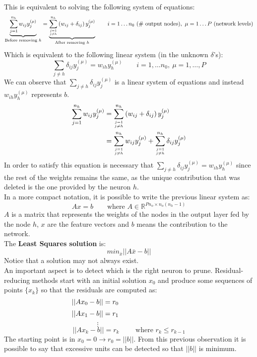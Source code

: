This is equivalent to solving the following system of equations:
$$\underbrace{\sum_{j=1}^{n_{h}} w_{ij} y_{j}^{(\mu)}}_{\text{Before removing }h} = \underbrace{\sum_{j=1 \atop j\neq h}^{n_{h}} \left( w_{ij} + \delta_{ij} \right) y_{j}^{ (\mu)}}_{\text{After removing }h} \qquad i=1 \dots n_0 \text{ (\# output nodes)},~\mu=1 \dots P \text{ (network levels)}$$
Which is equivalent to the following linear system (in the unknown $\delta$'s):
$$\sum_{j \neq h} \delta_{ij} y_{j}^{(\mu)} = w_{ih} y_{h}^{(\mu)} \qquad i=1, \dots n_0, ~ \mu=1,\dots, P$$
We can observe that $\sum_{j \neq h} \delta_{ij} y_{j}^{(\mu)}$ is a linear system of equations and instead $w_{ih} y_{h}^{(\mu)}$ represents $b$.
\begin{equation*}
\begin{split}
\sum_{j=1}^{n_{h}} w_{ij} y_{j}^{(\mu)} &= \sum_{j=1 \atop j\neq h}^{n_{h}} \left( w_{ij} + \delta_{ij} \right) y_{j}^{ (\mu)} \\
& = \sum_{j=1 \atop j\neq h}^{n_{h}} w_{ij}y_{j}^{ (\mu)} + \sum_{j=1 \atop j\neq h}^{n_{h}}\delta_{ij}  y_{j}^{ (\mu)}
\end{split}
\end{equation*}
In order to satisfy this equation is necessary that $\sum_{j \neq h} \delta_{ij} y_{j}^{(\mu)} = w_{ih} y_{h}^{(\mu)}$ since the rest of the weights remains the same, as the unique contribution that was deleted is the one provided by the neuron $h$.\\

In a more compact notation, it is possible to write the previous linear system as:
$$Ax = b \qquad \text{where } A \in \mathbb { R } ^ { P n _ { o } \times n _ { o } \left( n _ { h } - 1 \right) }$$
$A$ is a matrix that represents the weights of the nodes in the output layer fed by the node $h$, $x$ are the feature vectors and $b$ means the contribution to the network.\\
The \textbf{Least Squares solution} is:
$$min_{\bar{x}} \vert \vert A \bar{x} - b \vert \vert$$
Notice that a solution may not always exist.\\
An important aspect is to detect which is the right neuron to prune. Residual-reducing methods start with an initial solution $x_0$ and produce some sequences of points $\{x_k\}$ so that the residuals are computed as:
$$\vert \vert Ax_0 - b \vert \vert  = r_0 \hspace{9.7em} $$
$$\vert \vert Ax_1 - b \vert \vert  = r_1 \hspace{9.7em}$$
$$\vdots \hspace{9em}$$
$$\vert\vert Ax_k - b \vert \vert = r_k \qquad \text{ where } r_k \leq r_{k-1}$$
The starting point is in $x_0 = 0 \rightarrow r_0=||b||$.
From this previous observation it is possible to say that excessive units can be detected so that $|| b ||$ is minimum.\\

